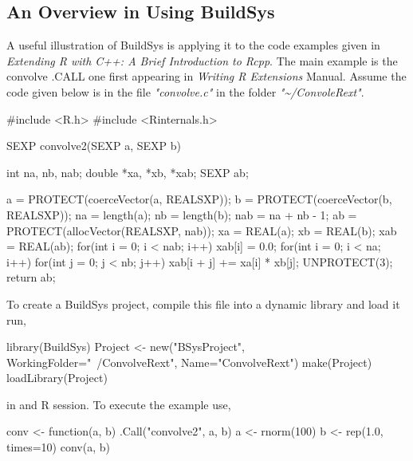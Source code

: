 \hypertarget{BuildSys-Overview}{%
\subsection{An Overview in Using BuildSys}
\label{visual-studio-code-extensions}}

A useful illustration of BuildSys is applying it to the code examples given in \emph{Extending R with C++: A Brief Introduction to Rcpp}\citep{RcppIntro}. The main example is 
the convolve .CALL one first appearing in \emph{Writing R Extensions}\citep{Rextensions} Manual. Assume the code given below is in the file \emph{"convolve.c"} in the folder \emph{"\textasciitilde/ConvoleRext"}.

\begin{Schunk}
  \begin{Sinput}
  #include <R.h>
  #include <Rinternals.h>
  
  SEXP convolve2(SEXP a, SEXP b)
  {
      int na, nb, nab;
      double *xa, *xb, *xab;
      SEXP ab;
  
      a = PROTECT(coerceVector(a, REALSXP));
      b = PROTECT(coerceVector(b, REALSXP));
      na = length(a); nb = length(b); nab = na + nb - 1;
      ab = PROTECT(allocVector(REALSXP, nab));
      xa = REAL(a); xb = REAL(b); xab = REAL(ab);
      for(int i = 0; i < nab; i++) xab[i] = 0.0;
      for(int i = 0; i < na; i++)
          for(int j = 0; j < nb; j++) xab[i + j] += xa[i] * xb[j];
      UNPROTECT(3);
      return ab;
  }
  \end{Sinput}
\end{Schunk}

To create a BuildSys project, compile this file into a dynamic library and load it run,

\begin{Schunk}
  \begin{Sinput}
  library(BuildSys)
  Project <- new("BSysProject", WorkingFolder="~/ConvolveRext", Name="ConvolveRext")
  make(Project)
  loadLibrary(Project)
  \end{Sinput}
\end{Schunk}

in and R session. To execute the example use,

\begin{Schunk}
  \begin{Sinput}
  conv <- function(a, b) .Call("convolve2", a, b)
  a <- rnorm(100)
  b <- rep(1.0, times=10)
  conv(a, b)
  \end{Sinput}
\end{Schunk}

